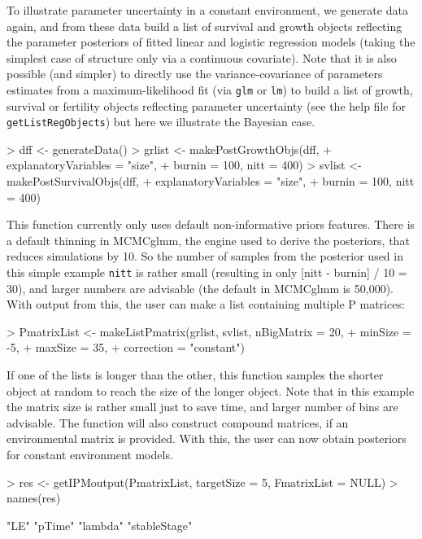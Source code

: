 \documentclass{article}
\begin{document}
To illustrate parameter uncertainty in a constant environment, we
generate data again, and from these data build a list of survival and growth
objects reflecting the parameter posteriors of fitted linear and logistic
regression models (taking the simplest case of structure only via a continuous
covariate). Note that it is also possible (and simpler) to directly use the variance-covariance of parameters estimates from a maximum-likelihood fit (via {\tt glm} or {\tt lm}) to build a list of growth, survival or fertility objects reflecting parameter uncertainty (see the help file for {\tt getListRegObjects}) but here we illustrate the Bayesian case.
\begin{Schunk}
\begin{Sinput}
> dff <- generateData()
> grlist <- makePostGrowthObjs(dff, 
+                              explanatoryVariables = "size", 
+                              burnin = 100, nitt = 400)
> svlist <- makePostSurvivalObjs(dff, 
+                                explanatoryVariables = "size", 
+                                burnin = 100, nitt = 400)
\end{Sinput}
\end{Schunk}
This function currently only uses default non-informative priors features. There is a default thinning in MCMCglmm, the engine used to derive the posteriors, that reduces simulations by 10. So the number of samples from the posterior used in this simple example
{\tt nitt} is rather small (resulting in only [nitt - burnin] / 10 = 30), and
larger numbers are advisable (the default in MCMCglmm is 50,000). With output from this, the user can make a list containing multiple P matrices:
\begin{Schunk}
\begin{Sinput}
> PmatrixList <- makeListPmatrix(grlist, svlist, nBigMatrix = 20, 
+                                minSize = -5, 
+                                maxSize = 35, 
+                                correction = "constant")
\end{Sinput}
\end{Schunk}
If one of the lists is longer than the other, this function samples the shorter object at random to reach the size of the longer object. Note that in this example the matrix size is rather small just to save time, and larger number of bins are advisable. The function will also construct compound matrices, if an environmental matrix is provided. With this, the user can now obtain  posteriors for constant environment models. 
\begin{Schunk}
\begin{Sinput}
> res <- getIPMoutput(PmatrixList, targetSize = 5, FmatrixList = NULL)
> names(res)
\end{Sinput}
\begin{Soutput}
[1] "LE"          "pTime"       "lambda"      "stableStage"
\end{Soutput}
\end{Schunk}
\end{document}
